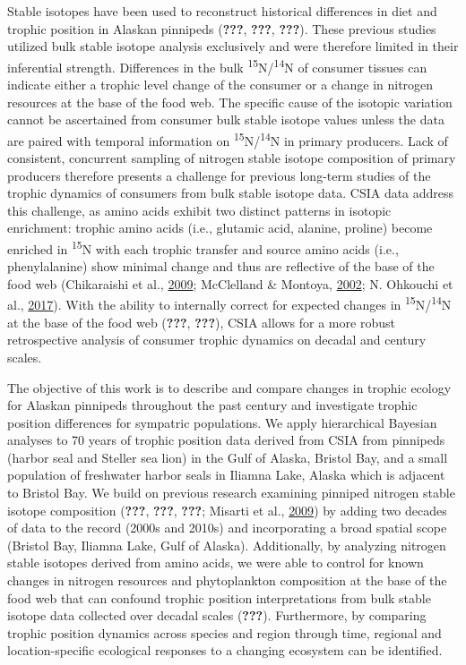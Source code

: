 \documentclass [11pt, proquest] {uwthesis}[2015/03/03]
\begin{document}
Stable isotopes have been used to reconstruct historical differences in
diet and trophic position in Alaskan pinnipeds ({\textbf{???}},
{\textbf{???}}, {\textbf{???}}). These previous studies utilized bulk
stable isotope analysis exclusively and were therefore limited in their
inferential strength. Differences in the bulk
\textsuperscript{15}N/\textsuperscript{14}N of consumer tissues can
indicate either a trophic level change of the consumer or a change in
nitrogen resources at the base of the food web. The specific cause of
the isotopic variation cannot be ascertained from consumer bulk stable
isotope values unless the data are paired with temporal information on
\textsuperscript{15}N/\textsuperscript{14}N in primary producers. Lack
of consistent, concurrent sampling of nitrogen stable isotope
composition of primary producers therefore presents a challenge for
previous long-term studies of the trophic dynamics of consumers from
bulk stable isotope data. CSIA data address this challenge, as amino
acids exhibit two distinct patterns in isotopic enrichment: trophic
amino acids (i.e., glutamic acid, alanine, proline) become enriched in
\textsuperscript{15}N with each trophic transfer and source amino acids
(i.e., phenylalanine) show minimal change and thus are reflective of the
base of the food web (Chikaraishi et al.,
\protect\hyperlink{ref-Chikaraishi2009}{2009}; McClelland \& Montoya,
\protect\hyperlink{ref-McClelland2002}{2002}; N. Ohkouchi et al.,
\protect\hyperlink{ref-Ohkouchi2017}{2017}). With the ability to
internally correct for expected changes in
\textsuperscript{15}N/\textsuperscript{14}N at the base of the food web
({\textbf{???}}, {\textbf{???}}), CSIA allows for a more robust
retrospective analysis of consumer trophic dynamics on decadal and
century scales.

The objective of this work is to describe and compare changes in trophic
ecology for Alaskan pinnipeds throughout the past century and
investigate trophic position differences for sympatric populations. We
apply hierarchical Bayesian analyses to 70 years of trophic position
data derived from CSIA from pinnipeds (harbor seal and Steller sea lion)
in the Gulf of Alaska, Bristol Bay, and a small population of freshwater
harbor seals in Iliamna Lake, Alaska which is adjacent to Bristol Bay.
We build on previous research examining pinniped nitrogen stable isotope
composition ({\textbf{???}}, {\textbf{???}}, {\textbf{???}}; Misarti et
al., \protect\hyperlink{ref-Misarti2009}{2009}) by adding two decades of
data to the record (2000s and 2010s) and incorporating a broad spatial
scope (Bristol Bay, Iliamna Lake, Gulf of Alaska). Additionally, by
analyzing nitrogen stable isotopes derived from amino acids, we were
able to control for known changes in nitrogen resources and
phytoplankton composition at the base of the food web that can confound
trophic position interpretations from bulk stable isotope data collected
over decadal scales ({\textbf{???}}). Furthermore, by comparing trophic
position dynamics across species and region through time, regional and
location-specific ecological responses to a changing ecosystem can be
identified.
\end{document}
